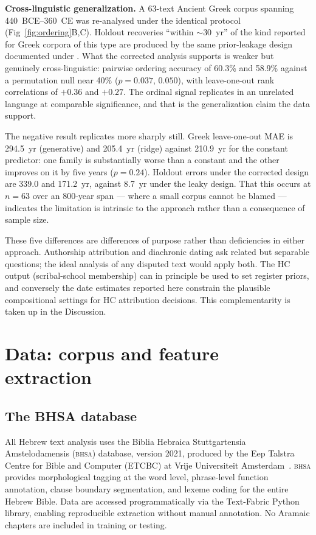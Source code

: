 \documentclass[10pt,letterpaper]{article}
\newcommand{\bhsa}{\textsc{bhsa}}
\begin{document}
\textbf{Cross-linguistic generalization.}
A 63-text Ancient Greek corpus spanning 440~BCE--360~CE was re-analysed
under the identical protocol (Fig~\ref{fig:ordering}B,C).  Holdout recoveries ``within $\sim$30~yr'' of the kind reported for Greek
corpora of this type are produced by the same prior-leakage design
documented under .  What the corrected analysis
supports is weaker but genuinely cross-linguistic:
pairwise ordering accuracy of 60.3\% and 58.9\% against a permutation null
near 40\% ($p = 0.037$, $0.050$), with leave-one-out rank correlations of
$+0.36$ and $+0.27$.  The ordinal signal replicates in an unrelated
language at comparable significance, and that is the generalization claim
the data support.

The negative result replicates more sharply still.  Greek leave-one-out
MAE is 294.5~yr (generative) and 205.4~yr (ridge) against 210.9~yr for the
constant predictor: one family is substantially worse than a constant and
the other improves on it by five years ($p = 0.24$).  Holdout errors under the corrected design are 339.0 and 171.2~yr, against
8.7~yr under the leaky design.
That this occurs at $n = 63$ over an 800-year span --- where a small
corpus cannot be blamed --- indicates the limitation is intrinsic to the
approach rather than a consequence of sample size.

These five differences are differences of purpose rather than
deficiencies in either approach.  Authorship attribution and diachronic
dating ask related but separable questions; the ideal analysis of any
disputed text would apply both.  The HC output (scribal-school membership)
can in principle be used to set register priors, and
conversely the date estimates reported here constrain the plausible compositional
settings for HC attribution decisions.  This complementarity is taken up
in the Discussion.

\section*{Data: corpus and feature extraction}

\subsection*{The BHSA database}

All Hebrew text analysis uses the Biblia Hebraica Stuttgartensia
Amstelodamensis (\bhsa{}) database, version 2021, produced by the Eep
Talstra Centre for Bible and Computer (ETCBC) at Vrije Universiteit
Amsterdam~\cite{BHSA2021,Roorda2018,Roorda2014}.  \bhsa{} provides
morphological tagging at the word level, phrase-level function annotation,
clause boundary segmentation, and lexeme coding for the entire Hebrew
Bible.  Data are accessed programmatically via the Text-Fabric Python
library, enabling reproducible extraction without manual annotation.  No
Aramaic chapters are included in training or testing.
\end{document}
